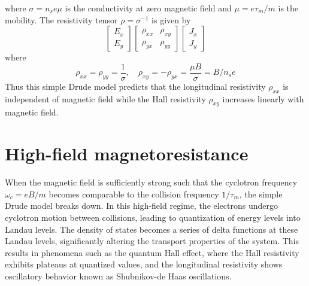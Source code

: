 \documentclass[11pt,a4paper]{book}
\theoremstyle{plain}
\theoremstyle{definition}
\theoremstyle{remark}
\begin{document}
where $\sigma = n_s e \mu$ is the conductivity at zero magnetic field and $\mu = e \tau_m/m$ is the mobility. The resistivity tensor $\rho = \sigma^{-1}$ is given by
\begin{equation}
    \begin{bmatrix}
        E_x \\ E_y
    \end{bmatrix}
    \begin{bmatrix}
        \rho_{xx} & \rho_{xy} \\
        \rho_{yx} & \rho_{yy}
    \end{bmatrix}
    \begin{bmatrix}
        J_x \\ J_y
    \end{bmatrix}
\end{equation}
where
\begin{equation}
    \rho_{xx} = \rho_{yy} = \frac{1}{\sigma}, \quad \rho_{xy} = -\rho_{yx} = \frac{\mu B}{\sigma} = B/n_s e
\end{equation}
Thus this simple Drude model predicts that the longitudinal resistivity $\rho_{xx}$ is independent of magnetic field while the Hall resistivity $\rho_{xy}$ increases linearly with magnetic field.

\section{High-field magnetoresistance}
When the magnetic field is sufficiently strong such that the cyclotron frequency $\omega_c = e B/m$ becomes comparable to the collision frequency $1/\tau_m$, the simple Drude model breaks down. In this high-field regime, the electrons undergo cyclotron motion between collisions, leading to quantization of energy levels into Landau levels. The density of states becomes a series of delta functions at these Landau levels, significantly altering the transport properties of the system. This results in phenomena such as the quantum Hall effect, where the Hall resistivity exhibits plateaus at quantized values, and the longitudinal resistivity shows oscillatory behavior known as Shubnikov-de Haas oscillations.
\end{document}
